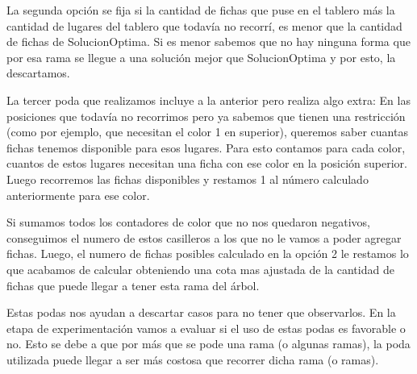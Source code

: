 La segunda opción se fija si la cantidad de fichas que puse en el tablero más la cantidad de lugares del tablero que todavía no recorrí, es menor que la cantidad de fichas de SolucionOptima. Si es menor sabemos que no hay ninguna forma que por esa rama se llegue a una solución mejor que SolucionOptima y por esto, la descartamos.

La tercer poda que realizamos incluye a la anterior pero realiza algo extra: En las posiciones que todavía no recorrimos pero ya sabemos que tienen una restricción (como por ejemplo, que necesitan el color 1 en superior), queremos saber cuantas fichas tenemos disponible para esos lugares. Para esto contamos para cada color, cuantos de estos lugares necesitan una ficha con ese color en la posición superior. Luego recorremos las fichas disponibles y restamos 1 al número calculado anteriormente para ese color.

Si sumamos todos los contadores de color que no nos quedaron negativos, conseguimos el numero de estos casilleros a los que no le vamos a poder agregar fichas. Luego, el numero de fichas posibles calculado en la opción 2 le restamos lo que acabamos de calcular obteniendo una cota mas ajustada de la cantidad de fichas que puede llegar a tener esta rama del árbol.

Estas podas nos ayudan a descartar casos para no tener que observarlos. En la etapa de experimentación vamos a evaluar si el uso de estas podas es favorable o no. Esto se debe a que por más que se pode una rama (o algunas ramas), la poda utilizada puede llegar a ser más costosa que recorrer dicha rama (o ramas).